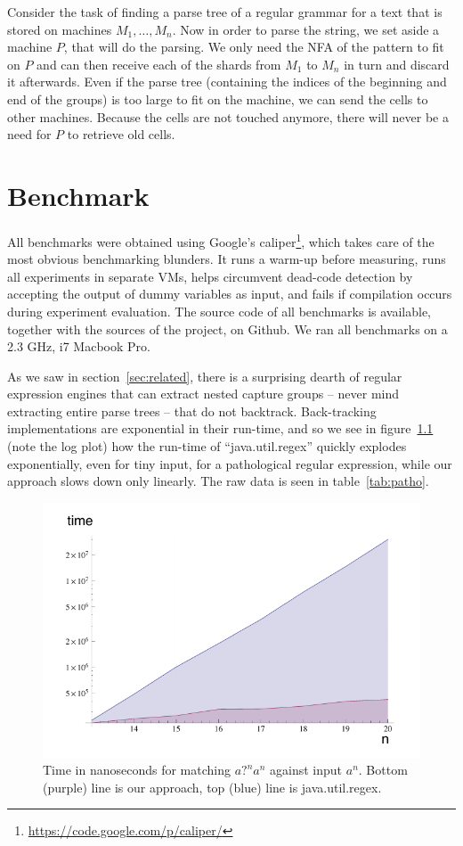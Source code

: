 \documentclass[11pt,a4paper,twoside,openright]{Thesis}
\theoremstyle{definition}
\newcommand{\Figref}[1]{figure~\ref{fig:#1}}
\newcommand{\Secref}[1]{section~\ref{sec:#1}}
\newcommand{\Tabref}[1]{table~\ref{tab:#1}}
\newcommand{\figlabel}[1]{\label{fig:#1}}
\newcommand{\seclabel}[1]{\label{sec:#1}}
\begin{document}
Consider the task of finding a parse tree of a regular grammar for a text
that is stored on machines $M_1, \dots, M_n$. Now in order to parse the
string, we set aside a machine $P$, that will do the parsing. We only need the NFA of the
pattern to fit on $P$ and can then receive each of the shards
from $M_1$ to $M_n$ in turn and discard it afterwards. Even if the parse tree
(containing the indices of the beginning and end of the groups) is too large
to fit on the machine, we can send the cells to other machines. Because the
cells are not touched anymore, there will never be a need for $P$ to retrieve
old cells.

\chapter{Benchmark}
\seclabel{benchmarks}
All benchmarks were obtained using Google's
caliper\footnote{\url{https://code.google.com/p/caliper/}}, which
takes care of the most obvious benchmarking blunders.  It runs a
warm-up before measuring, runs all experiments in separate VMs,
helps circumvent dead-code detection by accepting the output of
dummy variables as input, and fails if compilation occurs during
experiment evaluation.  The source code of all benchmarks is
available, together with the sources of the project, on Github. We
ran all benchmarks on a 2.3 GHz, i7 Macbook Pro.

As we saw in \Secref{related}, there is a surprising dearth
of regular expression engines that can extract nested capture groups
-- never mind extracting entire parse trees -- that do not backtrack.
Back-tracking implementations are exponential in their run-time,
and so we see in \Figref{patho} (note the log plot) how the run-time
of ``java.util.regex'' quickly explodes exponentially, even for tiny input, for
a pathological regular expression, while our approach slows down
only linearly. The raw data is seen in \Tabref{patho}.

\begin{figure}[htp]
\includegraphics[width=\linewidth]{graphs/pathological-with-axes.pdf}
\caption[Pathological regular expression parse time]{Time in nanoseconds for matching $\textit{a?}^n\textit{a}^n$ against
input $\textit{a}^n$. Bottom (purple) line is our approach, top (blue) line is
java.util.regex.}
\figlabel{patho}
\end{figure}
\end{document}
